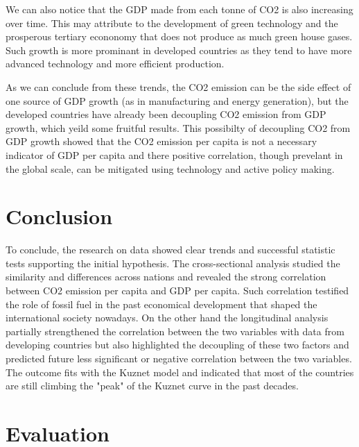 \documentclass[a4paper]{article}
\begin{document}
We can also notice that the GDP made from each tonne of CO2 is also increasing over time. This may attribute to the development of green technology and the prosperous tertiary econonomy that does not produce as much green house gases. Such growth is more prominant in developed countries as they tend to have more advanced technology and more efficient production.

As we can conclude from these trends, the CO2 emission can be the side effect of one source of GDP growth (as in manufacturing and energy generation), but the developed countries have already been decoupling CO2 emission from GDP growth, which yeild some fruitful results. This possibilty of decoupling CO2 from GDP growth showed that the CO2 emission per capita is not a necessary indicator of GDP per capita and there positive correlation, though prevelant in the global scale, can be mitigated using technology and active policy making. %

\section{Conclusion}

To conclude, the research on data showed clear trends and successful statistic tests supporting the initial hypothesis. The cross-sectional analysis studied the similarity and differences across nations and revealed the strong correlation between CO2 emission per capita and GDP per capita. Such correlation testified the role of fossil fuel in the past economical development that shaped the international society nowadays. On the other hand the longitudinal analysis partially strengthened the correlation between the two variables with data from developing countries but also highlighted the decoupling of these two factors and predicted future less significant or negative correlation between the two variables. The outcome fits with the Kuznet model and indicated that most of the countries are still climbing the "peak" of the Kuznet curve in the past decades.

\section{Evaluation}
\end{document}
